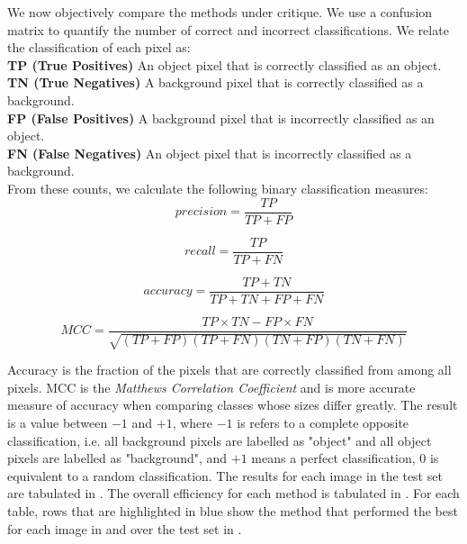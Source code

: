 \begin{definition}
	We now objectively compare the methods under critique. We use a confusion matrix to quantify the number of correct and incorrect classifications. We relate the classification of each pixel as:\\
	\textbf{TP (True Positives)} An object pixel that is correctly classified as an object.\\
	\textbf{TN (True Negatives)} A background pixel that is correctly classified as a background.\\
	\textbf{FP (False Positives)} A background pixel that is incorrectly classified as an object.\\
	\textbf{FN (False Negatives)} An object pixel that is incorrectly classified as a background.\\

	From these counts, we calculate the following binary classification measures:
	\begin{equation*}
		precision = \frac{TP}{TP+FP}
	\end{equation*}
	
	\begin{equation*}
		recall = \frac{TP}{TP+FN}
	\end{equation*}
	
	\begin{equation*}
		accuracy = \frac{TP+TN}{TP+TN+FP+FN}
	\end{equation*}
	
	\begin{equation*}
		MCC = \frac{TP \times TN - FP \times FN}{\sqrt{\left( TP + FP \right) \left( TP + FN \right) \left( TN + FP \right) \left( TN + FN \right)}}
	\end{equation*}
\end{definition}

Accuracy is the fraction of the pixels that are correctly classified from among all pixels. MCC is the \textit{Matthews Correlation Coefficient} and is more accurate measure of accuracy when comparing classes whose sizes differ greatly. The result is a value between $-1$ and $+1$, where $-1$ is refers to a complete opposite classification, i.e. all background pixels are labelled as "object" and all object pixels are labelled as "background", and $+1$ means a perfect classification, $0$ is equivalent to a random classification. The results for each image in the test set are tabulated in . The overall efficiency for each method is tabulated in . For each table, rows that are highlighted in blue show the method that performed the best for each image in  and over the test set in .

